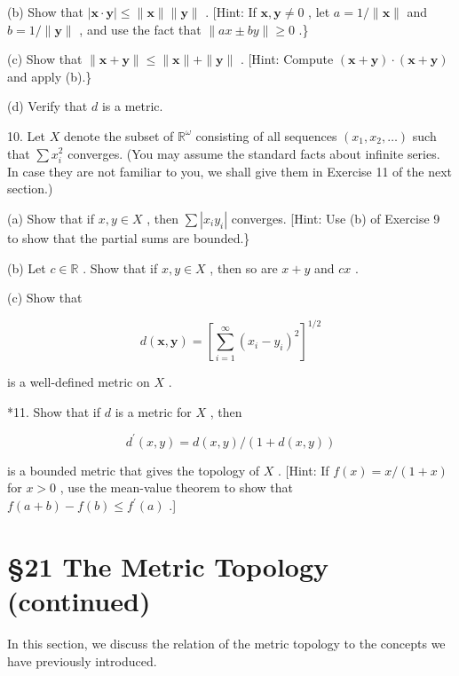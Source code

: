 (b) Show that \(\left| {\mathbf{x} \cdot  \mathbf{y}}\right|  \leq  \parallel \mathbf{x}\parallel \parallel \mathbf{y}\parallel\) . [Hint: If \(\mathbf{x},\mathbf{y} \neq  0\) , let \(a = 1/\parallel \mathbf{x}\parallel\) and \(b = 1/\parallel \mathbf{y}\parallel\) , and use the fact that \(\parallel {ax} \pm  {by}\parallel  \geq  0\) .\}

(c) Show that \(\parallel \mathbf{x} + \mathbf{y}\parallel  \leq  \parallel \mathbf{x}\parallel  + \parallel \mathbf{y}\parallel\) . [Hint: Compute \(\left( {\mathbf{x} + \mathbf{y}}\right)  \cdot  \left( {\mathbf{x} + \mathbf{y}}\right)\) and apply (b).\}

(d) Verify that \(d\) is a metric.

10. Let \(X\) denote the subset of \({\mathbb{R}}^{\omega }\) consisting of all sequences \(\left( {{x}_{1},{x}_{2},\ldots }\right)\) such that \(\sum {x}_{i}^{2}\) converges. (You may assume the standard facts about infinite series. In case they are not familiar to you, we shall give them in Exercise 11 of the next section.)

(a) Show that if \(x,y \in  X\) , then \(\sum \left| {{x}_{i}{y}_{i}}\right|\) converges. [Hint: Use (b) of Exercise 9 to show that the partial sums are bounded.\}

(b) Let \(c \in  \mathbb{R}\) . Show that if \(x,y \in  X\) , then so are \(x + y\) and \({cx}\) .

(c) Show that

\[
d\left( {\mathbf{x},\mathbf{y}}\right)  = {\left\lbrack  \mathop{\sum }\limits_{{i = 1}}^{\infty }{\left( {x}_{i} - {y}_{i}\right) }^{2}\right\rbrack  }^{1/2}
\]

is a well-defined metric on \(X\) .

*11. Show that if \(d\) is a metric for \(X\) , then

\[
{d}^{\prime }\left( {x,y}\right)  = d\left( {x,y}\right) /\left( {1 + d\left( {x,y}\right) }\right)
\]

is a bounded metric that gives the topology of \(X\) . [Hint: If \(f\left( x\right)  = x/\left( {1 + x}\right)\) for \(x > 0\) , use the mean-value theorem to show that \(f\left( {a + b}\right)  - f\left( b\right)  \leq  {f}^{\prime }\left( a\right)\) .]

\section*{§21 The Metric Topology (continued)}

In this section, we discuss the relation of the metric topology to the concepts we have previously introduced.


